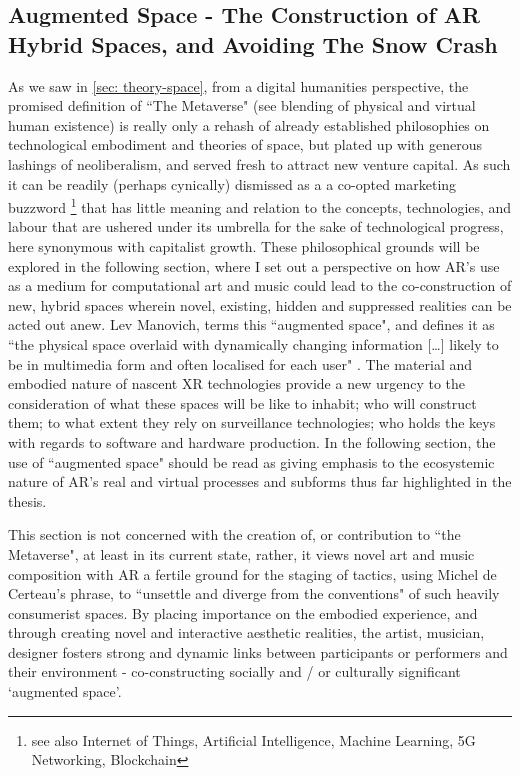 \subsection[Augmented Space]{Augmented Space - The Construction of AR Hybrid Spaces, and Avoiding The Snow Crash} \label{sec: discussion-medium-space}
As we saw in \autoref{sec: theory-space}, from a digital humanities perspective, the promised definition of ``The Metaverse" (see blending of physical and virtual human existence) is really only a rehash of already established philosophies on technological embodiment and theories of space, but plated up with generous lashings of neoliberalism, and served fresh to attract new venture capital. As such it can be readily (perhaps cynically) dismissed as a a co-opted marketing buzzword \footnote{see also Internet of Things, Artificial Intelligence, Machine Learning, 5G Networking, Blockchain} that has little meaning and relation to the concepts, technologies, and labour that are ushered under its umbrella for the sake of technological progress, here synonymous with capitalist growth. These philosophical grounds will be explored in the following section, where I set out a perspective on how AR's use as a medium for computational art and music could lead to the co-construction of new, hybrid spaces wherein novel, existing, hidden and suppressed realities can be acted out anew. Lev Manovich, terms this ``augmented space", and defines it as ``the physical space overlaid with dynamically changing information […] likely to be in multimedia form and often localised for each user" \citep[p. 2]{manovich2006}. The material and embodied nature of nascent XR technologies provide a new urgency to the consideration of what these spaces will be like to inhabit; who will construct them; to what extent they rely on surveillance technologies; who holds the keys with regards to software and hardware production. In the following section, the use of ``augmented space" should be read as giving emphasis to the ecosystemic nature of AR's real and virtual processes and subforms thus far highlighted in the thesis.  

This section is not concerned with the creation of, or contribution to ``the Metaverse", at least in its current state, rather, it views novel art and music composition with AR a fertile ground for the staging of tactics, using Michel de Certeau's phrase, to ``unsettle and diverge from the conventions" \citeyearpar[p. 36]{decerteau1984} of such heavily consumerist spaces. By placing importance on the embodied experience, and through creating novel and interactive aesthetic realities, the artist, musician, designer fosters strong and dynamic links between participants or performers and their environment - co-constructing socially and / or culturally significant `augmented space'.

